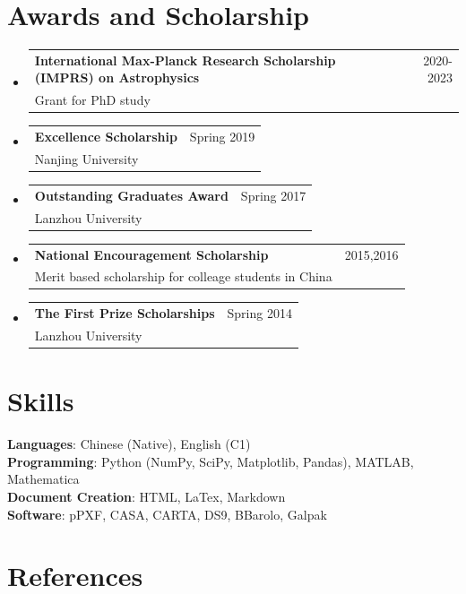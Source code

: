 \documentclass[A4,11pt]{article}
\makeatletter
\newcommand{\CVSubheading}[4]{
  \vspace{-2pt}\item
    \begin{tabular*}{0.97\textwidth}[t]{l@{\extracolsep{\fill}}r}
      \textbf{#1} & #2 \\
      \small#3 & \small #4 \\
    \end{tabular*}\vspace{-7pt}
}
\newcommand{\CVSubHeadingListStart}{\begin{itemize}[leftmargin=0.5cm, label={}]}
\newcommand{\CVSubHeadingListEnd}{\end{itemize}}
\makeatother
\begin{document}
\section{Awards and Scholarship}
  \CVSubHeadingListStart
    \CVSubheading
      {International Max-Planck Research Scholarship (IMPRS) on Astrophysics}{2020-2023}
      {Grant for PhD study}{}
    \CVSubheading
      {Excellence Scholarship}{Spring 2019}
      {Nanjing University}{}
    \CVSubheading
      {Outstanding Graduates Award}{Spring 2017}
      {Lanzhou University}{}
    \CVSubheading
      {National Encouragement Scholarship}{2015,2016}
      {Merit based scholarship for colleage students in China}{}
    \CVSubheading
      {The First Prize Scholarships}{Spring 2014}
      {Lanzhou University}{}
  \CVSubHeadingListEnd

\section{Skills}
 \begin{itemize}[leftmargin=0.5cm, label={}]
    \small{\item{
     \textbf{Languages}{: Chinese (Native), English (C1)} \\
     \textbf{Programming}{: Python (NumPy, SciPy, Matplotlib, Pandas), MATLAB, Mathematica} \\
     \textbf{Document Creation}{: HTML, LaTex, Markdown} \\
     \textbf{Software}{: pPXF, CASA, CARTA, DS9, BBarolo, Galpak}
    }}
 \end{itemize}

\section{References}
\end{document}
